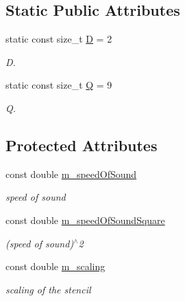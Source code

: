 \subsection*{Static Public Attributes}
\begin{DoxyCompactItemize}
\item 
\hypertarget{classnatrium_1_1D2Q9Model_a81532a1067ba5f280698a1a84711ede5}{static const size\-\_\-t \hyperlink{classnatrium_1_1D2Q9Model_a81532a1067ba5f280698a1a84711ede5}{D} = 2}\label{classnatrium_1_1D2Q9Model_a81532a1067ba5f280698a1a84711ede5}

\begin{DoxyCompactList}\small\item\em D. \end{DoxyCompactList}\item 
\hypertarget{classnatrium_1_1D2Q9Model_ad3d102dfb9c8ad7b56a8f82c3f4286f6}{static const size\-\_\-t \hyperlink{classnatrium_1_1D2Q9Model_ad3d102dfb9c8ad7b56a8f82c3f4286f6}{Q} = 9}\label{classnatrium_1_1D2Q9Model_ad3d102dfb9c8ad7b56a8f82c3f4286f6}

\begin{DoxyCompactList}\small\item\em Q. \end{DoxyCompactList}\end{DoxyCompactItemize}
\subsection*{Protected Attributes}
\begin{DoxyCompactItemize}
\item 
\hypertarget{classnatrium_1_1D2Q9Model_ab212c0c04921591f16c1970d93878cf9}{const double \hyperlink{classnatrium_1_1D2Q9Model_ab212c0c04921591f16c1970d93878cf9}{m\-\_\-speed\-Of\-Sound}}\label{classnatrium_1_1D2Q9Model_ab212c0c04921591f16c1970d93878cf9}

\begin{DoxyCompactList}\small\item\em speed of sound \end{DoxyCompactList}\item 
\hypertarget{classnatrium_1_1D2Q9Model_afa28316438de5055d51674d89a0075ba}{const double \hyperlink{classnatrium_1_1D2Q9Model_afa28316438de5055d51674d89a0075ba}{m\-\_\-speed\-Of\-Sound\-Square}}\label{classnatrium_1_1D2Q9Model_afa28316438de5055d51674d89a0075ba}

\begin{DoxyCompactList}\small\item\em (speed of sound)$^\wedge$2 \end{DoxyCompactList}\item 
\hypertarget{classnatrium_1_1D2Q9Model_ab0aa145ad44fe849371f8bda592eadf2}{const double \hyperlink{classnatrium_1_1D2Q9Model_ab0aa145ad44fe849371f8bda592eadf2}{m\-\_\-scaling}}\label{classnatrium_1_1D2Q9Model_ab0aa145ad44fe849371f8bda592eadf2}

\begin{DoxyCompactList}\small\item\em scaling of the stencil \end{DoxyCompactList}\end{DoxyCompactItemize}


